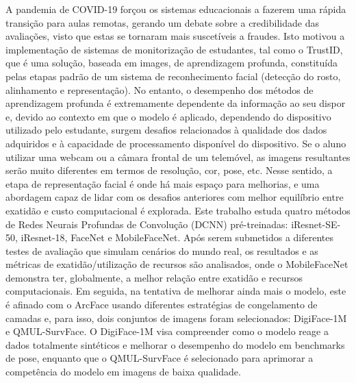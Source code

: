 \documentclass[class=report, crop=false, a4paper, 12pt]{standalone}
\begin{document}
\par A pandemia de COVID-19 forçou os sistemas educacionais a fazerem uma rápida transição para aulas remotas, gerando um debate sobre a credibilidade das avaliações, visto que estas se tornaram mais suscetíveis a fraudes. Isto motivou a implementação de sistemas de monitorização de estudantes, tal como o TrustID, que é uma solução, baseada em images, de aprendizagem profunda, constituída pelas etapas padrão de um sistema de reconhecimento facial (detecção do rosto, alinhamento e representação). No entanto, o desempenho dos métodos de aprendizagem profunda é extremamente dependente da informação ao seu dispor e, devido ao contexto em que o modelo é aplicado, dependendo do dispositivo utilizado pelo estudante, surgem desafios relacionados à qualidade dos dados adquiridos e à capacidade de processamento disponível do dispositivo. Se o aluno utilizar uma webcam ou a câmara frontal de um telemóvel, as imagens resultantes serão muito diferentes em termos de resolução, cor, pose, etc. Nesse sentido, a etapa de representação facial é onde há mais espaço para melhorias, e uma abordagem capaz de lidar com os desafios anteriores com melhor equilíbrio entre exatidão e custo computacional é explorada. Este trabalho estuda quatro métodos de Redes Neurais Profundas de Convolução (DCNN) pré-treinadas: iResnet-SE-50, iResnet-18, FaceNet e MobileFaceNet. Após serem submetidos a diferentes testes de avaliação que simulam cenários do mundo real, os resultados e as métricas de exatidão/utilização de recursos são analisados, onde o MobileFaceNet demonstra ter, globalmente, a melhor relação entre exatidão e recursos computacionais. Em seguida, na tentativa de melhorar ainda mais o modelo, este é afinado com o ArcFace usando diferentes estratégias de congelamento de camadas e, para isso, dois conjuntos de imagens foram selecionados: DigiFace-1M e QMUL-SurvFace. O DigiFace-1M visa compreender como o modelo reage a dados totalmente sintéticos e melhorar o desempenho do modelo em benchmarks de pose, enquanto que o QMUL-SurvFace é selecionado para aprimorar a competência do modelo em imagens de baixa qualidade.
\end{document}
